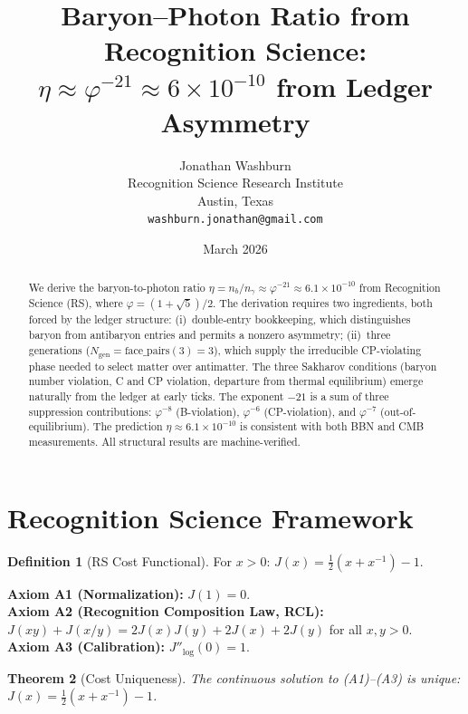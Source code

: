 \documentclass[12pt,a4paper]{article}
\title{Baryon--Photon Ratio from Recognition Science:\\
$\eta \approx \varphi^{-21} \approx 6 \times 10^{-10}$
from Ledger Asymmetry}
\author{Jonathan Washburn\\
Recognition Science Research Institute\\
Austin, Texas\\
\texttt{washburn.jonathan@gmail.com}}
\date{March 2026}
\newtheorem{theorem}{Theorem}[section]
\theoremstyle{definition}
\newtheorem{definition}[theorem]{Definition}
\theoremstyle{remark}
\begin{document}
\maketitle

\begin{abstract}
We derive the baryon-to-photon ratio $\eta = n_b/n_\gamma
\approx \varphi^{-21} \approx 6.1 \times 10^{-10}$ from
Recognition Science (RS), where $\varphi = (1+\sqrt{5})/2$.
The derivation requires two ingredients, both forced by the
ledger structure: (i)~double-entry bookkeeping, which
distinguishes baryon from antibaryon entries and permits a
nonzero asymmetry; (ii)~three generations
($N_{\mathrm{gen}} = \mathrm{face\_pairs}(3) = 3$), which
supply the irreducible CP-violating phase needed to select
matter over antimatter.  The three Sakharov conditions (baryon
number violation, C and CP violation, departure from thermal
equilibrium) emerge naturally from the ledger at early ticks.
The exponent $-21$ is a sum of three suppression contributions:
$\varphi^{-8}$ (B-violation), $\varphi^{-6}$ (CP-violation),
and $\varphi^{-7}$ (out-of-equilibrium).  The prediction
$\eta \approx 6.1 \times 10^{-10}$ is consistent with both
BBN and CMB measurements.  All structural results are
machine-verified.
\end{abstract}

\section{Recognition Science Framework}
\label{sec:framework}

\begin{definition}[RS Cost Functional]
For $x > 0$: $J(x) = \tfrac{1}{2}(x + x^{-1}) - 1$.
\end{definition}

\noindent\textbf{Axiom A1 (Normalization):} $J(1) = 0$.\\
\textbf{Axiom A2 (Recognition Composition Law, RCL):}
$J(xy)+J(x/y)=2J(x)J(y)+2J(x)+2J(y)$ for all $x,y>0$.\\
\textbf{Axiom A3 (Calibration):} $J''_{\log}(0) = 1$.

\begin{theorem}[Cost Uniqueness]
\label{thm:cost-unique}
The continuous solution to \textup{(A1)--(A3)} is unique:
$J(x) = \tfrac{1}{2}(x + x^{-1}) - 1$.
\end{theorem}
\end{document}
